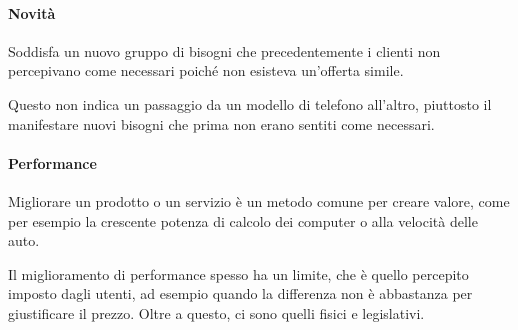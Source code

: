 \paragraph*{Novità} Soddisfa un nuovo gruppo di bisogni che precedentemente i
clienti non percepivano come necessari poiché non esisteva un'offerta simile.

Questo non indica un passaggio da un modello di telefono all'altro, piuttosto
il manifestare nuovi bisogni che prima non erano sentiti come necessari.

\paragraph*{Performance} Migliorare un prodotto o un servizio è un metodo
comune per creare valore, come per esempio la crescente potenza di calcolo dei
computer o alla velocità delle auto.

Il miglioramento di performance spesso ha un limite, che è quello percepito
imposto dagli utenti, ad esempio quando la differenza non è abbastanza per
giustificare il prezzo. Oltre a questo, ci sono quelli fisici e legislativi.
